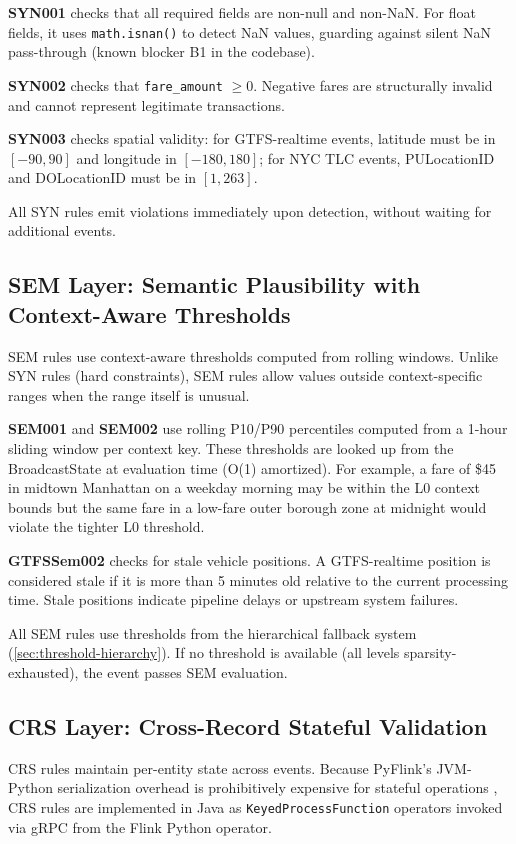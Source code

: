 \textbf{SYN001} checks that all required fields are non-null and non-NaN.
For float fields, it uses \texttt{math.isnan()} to detect NaN values, guarding
against silent NaN pass-through (known blocker B1 in the codebase).

\textbf{SYN002} checks that \texttt{fare\_amount} $\geq 0$. Negative fares
are structurally invalid and cannot represent legitimate transactions.

\textbf{SYN003} checks spatial validity: for GTFS-realtime events, latitude
must be in $[-90, 90]$ and longitude in $[-180, 180]$; for NYC TLC events,
PULocationID and DOLocationID must be in $[1, 263]$.

All SYN rules emit violations immediately upon detection, without waiting for
additional events.

\subsection{SEM Layer: Semantic Plausibility with Context-Aware Thresholds}

SEM rules use context-aware thresholds computed from rolling windows.
Unlike SYN rules (hard constraints), SEM rules allow values outside
context-specific ranges when the range itself is unusual.

\textbf{SEM001} and \textbf{SEM002} use rolling P10/P90 percentiles
computed from a 1-hour sliding window per context key. These thresholds
are looked up from the BroadcastState at evaluation time (O(1) amortized).
For example, a fare of \$45 in midtown Manhattan on a weekday morning may
be within the L0 context bounds but the same fare in a low-fare outer
borough zone at midnight would violate the tighter L0 threshold.

\textbf{GTFSSem002} checks for stale vehicle positions. A GTFS-realtime
position is considered stale if it is more than 5 minutes old relative to
the current processing time. Stale positions indicate pipeline delays or
upstream system failures.

All SEM rules use thresholds from the hierarchical fallback system
(\ref{sec:threshold-hierarchy}). If no threshold is available (all levels
sparsity-exhausted), the event passes SEM evaluation.

\subsection{CRS Layer: Cross-Record Stateful Validation}

CRS rules maintain per-entity state across events. Because PyFlink's JVM-Python
serialization overhead is prohibitively expensive for stateful operations
\citep{apache_flink}, CRS rules are implemented in Java as
\texttt{KeyedProcessFunction} operators invoked via gRPC from the Flink
Python operator.

